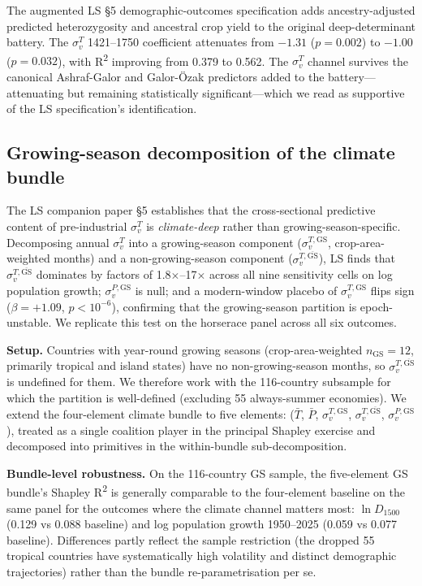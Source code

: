 \documentclass[11pt,letterpaper]{article}
\begin{document}
The augmented LS \S5 demographic-outcomes specification adds ancestry-adjusted predicted heterozygosity and ancestral crop yield to the original deep-determinant battery. The $\sigma_v^T$ 1421--1750 coefficient attenuates from $-1.31$ ($p=0.002$) to $-1.00$ ($p=0.032$), with R\textsuperscript{2} improving from 0.379 to 0.562. The $\sigma_v^T$ channel survives the canonical Ashraf-Galor and Galor-\"Ozak predictors added to the battery---attenuating but remaining statistically significant---which we read as supportive of the LS specification's identification.

\subsection{Growing-season decomposition of the climate bundle}
\label{sec:gs-decomposition}

The LS companion paper \citep{alonso_long_shadow} \S5 establishes that the cross-sectional predictive content of pre-industrial $\sigma_v^T$ is \textit{climate-deep} rather than growing-season-specific. Decomposing annual $\sigma_v^T$ into a growing-season component ($\sigma_v^{T,\mathrm{GS}}$, crop-area-weighted months) and a non-growing-season component ($\sigma_v^{T,\overline{\mathrm{GS}}}$), LS finds that $\sigma_v^{T,\overline{\mathrm{GS}}}$ dominates by factors of 1.8$\times$--17$\times$ across all nine sensitivity cells on log population growth; $\sigma_v^{P,\mathrm{GS}}$ is null; and a modern-window placebo of $\sigma_v^{T,\mathrm{GS}}$ flips sign ($\beta = +1.09$, $p < 10^{-6}$), confirming that the growing-season partition is epoch-unstable. We replicate this test on the horserace panel across all six outcomes.

\textbf{Setup.} Countries with year-round growing seasons (crop-area-weighted $n_{\mathrm{GS}} = 12$, primarily tropical and island states) have no non-growing-season months, so $\sigma_v^{T,\overline{\mathrm{GS}}}$ is undefined for them. We therefore work with the 116-country subsample for which the partition is well-defined (excluding 55 always-summer economies). We extend the four-element climate bundle to five elements: ($\bar T$, $\bar P$, $\sigma_v^{T,\mathrm{GS}}$, $\sigma_v^{T,\overline{\mathrm{GS}}}$, $\sigma_v^{P,\mathrm{GS}}$), treated as a single coalition player in the principal Shapley exercise and decomposed into primitives in the within-bundle sub-decomposition.

\textbf{Bundle-level robustness.} On the 116-country GS sample, the five-element GS bundle's Shapley R\textsuperscript{2} is generally comparable to the four-element baseline on the same panel for the outcomes where the climate channel matters most: $\ln D_{1500}$ (0.129 vs 0.088 baseline) and log population growth 1950--2025 (0.059 vs 0.077 baseline). Differences partly reflect the sample restriction (the dropped 55 tropical countries have systematically high volatility and distinct demographic trajectories) rather than the bundle re-parametrisation per se.
\end{document}
